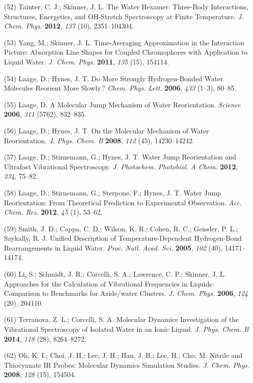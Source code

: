 \documentclass[]{article}
\begin{document}
(52) Tainter, C. J.; Skinner, J. L. The Water Hexamer: Three-Body
Interactions, Structures, Energetics, and OH-Stretch Spectroscopy at
Finite Temperature. \emph{J. Chem. Phys.} \textbf{2012}, \emph{137}
(10), 2351--104304.

(53) Yang, M.; Skinner, J. L. Time-Averaging Approximation in the
Interaction Picture: Absorption Line Shapes for Coupled Chromophores
with Application to Liquid Water. \emph{J. Chem. Phys.} \textbf{2011},
\emph{135} (15), 154114.

(54) Laage, D.; Hynes, J. T. Do More Strongly Hydrogen-Bonded Water
Molecules Reorient More Slowly\,? \emph{Chem. Phys. Lett.}
\textbf{2006}, \emph{433} (1--3), 80--85.

(55) Laage, D. A Molecular Jump Mechanism of Water Reorientation.
\emph{Science} \textbf{2006}, \emph{311} (5762), 832--835.

(56) Laage, D.; Hynes, J. T. On the Molecular Mechanism of Water
Reorientation. \emph{J. Phys. Chem. B} \textbf{2008}, \emph{112} (45),
14230--14242.

(57) Laage, D.; Stirnemann, G.; Hynes, J. T. Water Jump Reorientation
and Ultrafast Vibrational Spectroscopy. \emph{J. Photochem. Photobiol. A
Chem.} \textbf{2012}, \emph{234}, 75--82.

(58) Laage, D.; Stirnemann, G.; Sterpone, F.; Hynes, J. T. Water Jump
Reorientation: From Theoretical Prediction to Experimental Observation.
\emph{Acc. Chem. Res.} \textbf{2012}, \emph{45} (1), 53--62.

(59) Smith, J. D.; Cappa, C. D.; Wilson, K. R.; Cohen, R. C.; Geissler,
P. L.; Saykally, R. J. Unified Description of Temperature-Dependent
Hydrogen-Bond Rearrangements in Liquid Water. \emph{Proc. Natl. Acad.
Sci.} \textbf{2005}, \emph{102} (40), 14171--14174.

(60) Li, S.; Schmidt, J. R.; Corcelli, S. A.; Lawrence, C. P.; Skinner,
J. L. Approaches for the Calculation of Vibrational Frequencies in
Liquids: Comparison to Benchmarks for Azide/water Clusters. \emph{J.
Chem. Phys.} \textbf{2006}, \emph{124} (20), 204110.

(61) Terranova, Z. L.; Corcelli, S. A. Molecular Dynamics Investigation
of the Vibrational Spectroscopy of Isolated Water in an Ionic Liquid.
\emph{J. Phys. Chem. B} \textbf{2014}, \emph{118} (28), 8264--8272.

(62) Oh, K. I.; Choi, J. H.; Lee, J. H.; Han, J. B.; Lee, H.; Cho, M.
Nitrile and Thiocyanate IR Probes: Molecular Dynamics Simulation
Studies. \emph{J. Chem. Phys.} \textbf{2008}, \emph{128} (15), 154504.
\end{document}
